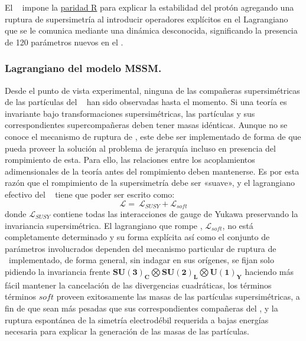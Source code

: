 El \MSSM ~ impone la \href{https://es.wikipedia.org/wiki/Paridad\_R}{paridad R} para explicar la estabilidad del protón agregando una ruptura de supersimetría al introducir operadores explícitos en el Lagrangiano que se le comunica mediante una dinámica desconocida, significando la presencia de 120 parámetros nuevos en el \MSSM. %

\subsubsection{Lagrangiano del modelo MSSM.}
Desde el punto de vista experimental, ninguna de las compañeras supersimétricas de las partículas del \ME ~ han sido observadas hasta el momento. Si una teoría es invariante bajo transformaciones supersimétricas, las partículas y sus correspondientes supercompañeras deben tener masas idénticas. %
Aunque no se conoce el mecanismo de ruptura de \SUSY, este debe ser implementado de forma de que pueda proveer la solución al problema de jerarquía incluso en presencia del rompimiento de esta. Para ello, las relaciones entre los acoplamientos adimensionales de la teoría antes del rompimiento deben mantenerse. Es por esta razón que el rompimiento de la supersimetría debe ser «suave», y el lagrangiano efectivo
del \MSSM ~ tiene que poder ser escrito como:
\begin{equation}
\mathcal{L} = ~ \mathcal{L}_{SUSY}+\mathcal{L}_{soft}
\end{equation}
donde $\mathcal{L}_{SUSY}$ contiene todas las interacciones de gauge de Yukawa preservando la invariancia supersimétrica. El lagrangiano que rompe \SUSY, $\mathcal{L}_{soft}$, no está completamente determinado y su forma explícita así como el conjunto de parámetros involucrados dependen del mecanismo particular de ruptura de \SUSY ~implementado, de forma general, sin indagar en sus orígenes, se fijan solo pidiendo la
invariancia frente $\mathbf{SU(3)_C} \bigotimes \mathbf{SU(2)_L} \bigotimes \mathbf{U(1)_Y}$ haciendo más fácil mantener la cancelación de las divergencias cuadráticas, los términos términos $soft$ proveen exitosamente las masas de las partículas
supersimétricas, a fin de que sean más pesadas que sus correspondientes compañeras del \ME, y la ruptura espontánea de la simetría electrodébil requerida a bajas energías necesaria para explicar la generación de las masas de las partículas. %


